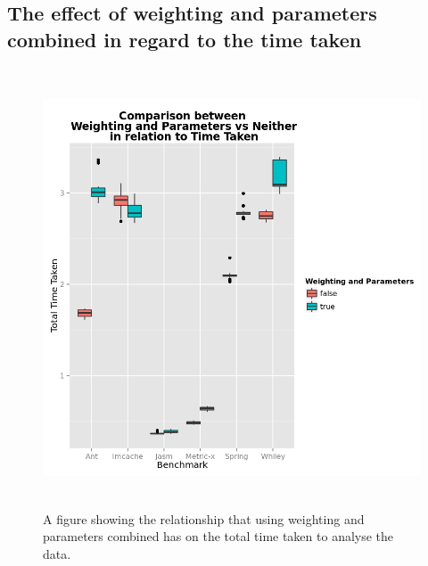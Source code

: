 \documentclass[11pt
              , a4paper
              , twoside
              , openright
              ]{report}
\begin{document}
\begin{appendices}
\chapter{The effect of weighting and parameters combined in regard to the time taken}
\begin{figure}[h]
\centering
\includegraphics[width=\textwidth,height=13cm]{WeightnParamTime.png}
\caption{A figure showing the relationship that using weighting and parameters combined has on the total time taken to analyse the data.}
\label{fig:weightparamtime}
\end{figure}


\end{appendices}
\end{document}
